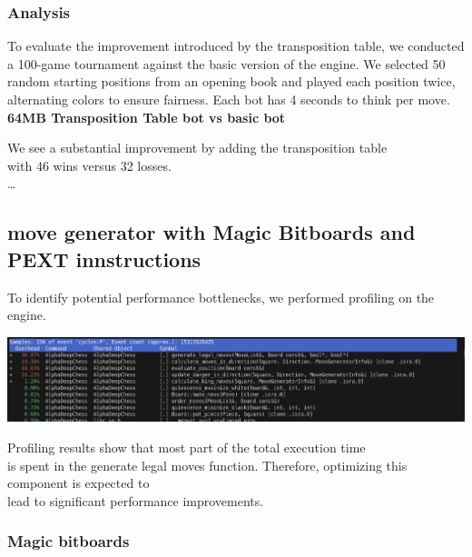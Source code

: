 \subsubsection{Analysis}

To evaluate the improvement introduced by the transposition table, we conducted\\
a 100-game tournament against the basic version of the engine. We selected 50\\
random starting positions from an opening book and played each position twice,\\
alternating colors to ensure fairness. Each bot has 4 seconds to think per move.\\

\textbf{64MB Transposition Table bot vs basic bot}\\
\medskip

We see a substantial improvement by adding the transposition table\\
with 46 wins versus 32 losses.\\

\ldots

\subsection{move generator with Magic Bitboards and PEXT innstructions}

To identify potential performance bottlenecks, we performed profiling on the engine.\\

\begin{center}
    \includegraphics[width=1.0\textwidth]{Imagenes/basic_move_generator_profiling.png}
\end{center}

Profiling results show that most part of the total execution time\\
is spent in the generate legal moves function. Therefore, optimizing this component is expected to\\
lead to significant performance improvements.\\

\subsubsection{Magic bitboards}

